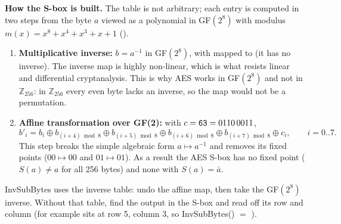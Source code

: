 \textbf{How the S-box is built.} The table is not arbitrary; each entry is computed in two steps from the byte $a$ viewed as a polynomial in GF$(2^8)$ with modulus $m(x) = x^8 + x^4 + x^3 + x + 1$ ().
\begin{enumerate}
  \item \textbf{Multiplicative inverse:} $b = a^{-1}$ in GF$(2^8)$, with  mapped to  (it has no inverse). The inverse map is highly non-linear, which is what resists linear and differential cryptanalysis. This is why AES works in GF$(2^8)$ and not in $\mathbb{Z}_{256}$: in $\mathbb{Z}_{256}$ every even byte lacks an inverse, so the map would not be a permutation.
  \item \textbf{Affine transformation over GF(2):} with $c = \texttt{63} = 0110\,0011$,
  \[
  b'_i = b_i \oplus b_{(i+4) \bmod 8} \oplus b_{(i+5) \bmod 8} \oplus b_{(i+6) \bmod 8} \oplus b_{(i+7) \bmod 8} \oplus c_i, \qquad i = 0..7 .
  \]
  This step breaks the simple algebraic form $a \mapsto a^{-1}$ and removes its fixed points ($00 \mapsto 00$ and $01 \mapsto 01$). As a result the AES S-box has no fixed point ($S(a) \ne a$ for all 256 bytes) and none with $S(a) = \bar{a}$.
\end{enumerate}
InvSubBytes uses the inverse table: undo the affine map, then take the GF$(2^8)$ inverse. Without that table, find the output in the S-box and read off its row and column (for example  sits at row 5, column 3, so InvSubBytes() $=$ ).

